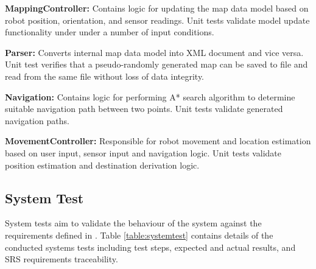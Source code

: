 \documentclass[12pt]{article}
\begin{document}
\begin{description}
\item{\textbf{MappingController:}} Contains logic for updating the map data model based on robot position, orientation, and sensor readings. Unit tests validate model update functionality under under a number of input conditions.

\item{\textbf{Parser:}} Converts internal map data model into XML document and vice versa. Unit test verifies that a pseudo-randomly generated map can be saved to file and read from the same file without loss of data integrity.

\item{\textbf{Navigation:}} Contains logic for performing A* search algorithm to determine suitable navigation path between two points. Unit tests validate generated navigation paths.

\item{\textbf{MovementController:}} Responsible for robot movement and location estimation based on user input, sensor input and navigation logic. Unit tests validate position estimation and destination derivation logic.

\end{description}

\subsection{System Test}

System tests aim to validate the behaviour of the system against the requirements defined in \cite{srs}. Table \ref{table:systemtest} contains details of the conducted systems tests including test steps, expected and actual results, and SRS requirements traceability.
\end{document}
